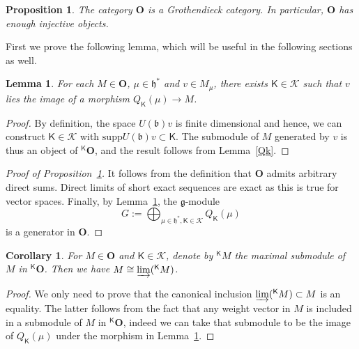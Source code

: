 \documentclass[11pt]{amsart}
\newcommand{\cK}{\mathcal{K}}
\newcommand{\KKK}{\mathsf{K}}
\newcommand{\supp}{\mathrm{supp}}
\newcommand{\bO}{\mathbf{O}}
\newcommand{\fg}{\mathfrak{g}}
\newcommand{\fh}{\mathfrak{h}}
\newcommand{\fb}{\mathfrak{b}}
\numberwithin{equation}{section}
\theoremstyle{plain}
\newtheorem{prop}[subsubsection]{Proposition}
\newtheorem{lemma}[subsubsection]{Lemma}
\newtheorem{cor}[subsubsection]{Corollary}
\theoremstyle{remark}
\theoremstyle{remark}
\theoremstyle{construction}
\begin{document}
\begin{prop}\label{PropGroth}
The category $\bO$ is a Grothendieck category. In particular, $\bO$ has enough injective objects.
\end{prop}
First we prove the following lemma, which will be useful in the following sections as well.

\begin{lemma}\label{LemQO}
For each $M\in\bO$, $\mu\in\fh^\ast$ and $v\in M_\mu$, there exists $\KKK\in\cK$ such that $v$ {lies} the image of a morphism $Q_{\KKK}(\mu)\to M$.
\end{lemma}
\begin{proof}
By definition, the space $U(\fb)v$ is finite dimensional and hence, we can construct $\KKK\in\cK$ with $\supp U(\fb)v\subset \KKK$. The submodule of $M$ generated by $v$ is thus {an object of} ${}^{\KKK}\bO${,} and the result follows from Lemma~\ref{Qk}.
\end{proof}


\begin{proof}[Proof of Proposition~\ref{PropGroth}]
It follows from the definition that $\bO$ admits arbitrary direct sums. Direct limits of short exact sequences are exact as this is true for vector spaces. Finally, by Lemma~\ref{LemQO}, the $\fg$-module
$$G:=\bigoplus_{\mu\in\fh^\ast,\KKK\in\cK}Q_{\KKK}(\mu)$$
 is a generator in $\bO$.
\end{proof}

\begin{cor}\label{CorDL}
For $M\in\bO$ and $\KKK\in\cK$, denote by ${}^{\KKK}M$ the maximal submodule of $M$ in ${}^{\KKK}\bO$.
Then we have $M\cong \varinjlim ({}^{\KKK}M)$.
\end{cor} 
\begin{proof}
We only need to prove that the canonical inclusion $\varinjlim ({}^{\KKK}M)\subset M$ is an equality. The latter follows from the fact that any weight vector in $M$ is included in a submodule of $M$ in ${}^{\KKK}\bO$, indeed we can take that submodule to be the image of $Q_{\KKK}(\mu)$ under the morphism in Lemma~\ref{LemQO}.
\end{proof}
\end{document}
